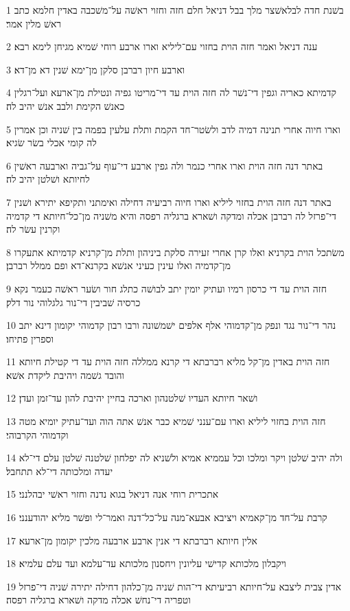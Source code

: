 \par 1 בשׁנת חדה לבלאשׁצר מלך בבל דניאל חלם חזה וחזוי ראשׁה על־משׁכבה באדין חלמא כתב ראשׁ מלין אמר׃
\par 2 ענה דניאל ואמר חזה הוית בחזוי עם־ליליא וארו ארבע רוחי שׁמיא מגיחן לימא רבא׃
\par 3 וארבע חיון רברבן סלקן מן־ימא שׁנין דא מן־דא׃
\par 4 קדמיתא כאריה וגפין די־נשׁר לה חזה הוית עד די־מריטו גפיה ונטילת מן־ארעא ועל־רגלין כאנשׁ הקימת ולבב אנשׁ יהיב לה׃
\par 5 וארו חיוה אחרי תנינה דמיה לדב ולשׂטר־חד הקמת ותלת עלעין בפמה בין שׁניה וכן אמרין לה קומי אכלי בשׂר שׂגיא׃
\par 6 באתר דנה חזה הוית וארו אחרי כנמר ולה גפין ארבע די־עוף על־גביה וארבעה ראשׁין לחיותא ושׁלטן יהיב לה׃
\par 7 באתר דנה חזה הוית בחזוי ליליא וארו חיוה רביעיה דחילה ואימתני ותקיפא יתירא ושׁנין די־פרזל לה רברבן אכלה ומדקה ושׁארא ברגליה רפסה והיא משׁניה מן־כל־חיותא די קדמיה וקרנין עשׂר לה׃
\par 8 משׂתכל הוית בקרניא ואלו קרן אחרי זעירה סלקת ביניהון ותלת מן־קרניא קדמיתא אתעקרו מן־קדמיה ואלו עינין כעיני אנשׁא בקרנא־דא ופם ממלל רברבן׃
\par 9 חזה הוית עד די כרסון רמיו ועתיק יומין יתב לבושׁה כתלג חור ושׂער ראשׁה כעמר נקא כרסיה שׁביבין די־נור גלגלוהי נור דלק׃
\par 10 נהר די־נור נגד ונפק מן־קדמוהי אלף אלפים ישׁמשׁונה ורבו רבון קדמוהי יקומון דינא יתב וספרין פתיחו׃
\par 11 חזה הוית באדין מן־קל מליא רברבתא די קרנא ממללה חזה הוית עד די קטילת חיותא והובד גשׁמה ויהיבת ליקדת אשׁא׃
\par 12 ושׁאר חיותא העדיו שׁלטנהון וארכה בחיין יהיבת להון עד־זמן ועדן׃
\par 13 חזה הוית בחזוי ליליא וארו עם־ענני שׁמיא כבר אנשׁ אתה הוה ועד־עתיק יומיא מטה וקדמוהי הקרבוהי׃
\par 14 ולה יהיב שׁלטן ויקר ומלכו וכל עממיא אמיא ולשׁניא לה יפלחון שׁלטנה שׁלטן עלם די־לא יעדה ומלכותה די־לא תתחבל׃
\par 15 אתכרית רוחי אנה דניאל בגוא נדנה וחזוי ראשׁי יבהלנני׃
\par 16 קרבת על־חד מן־קאמיא ויציבא אבעא־מנה על־כל־דנה ואמר־לי ופשׁר מליא יהודענני׃
\par 17 אלין חיותא רברבתא די אנין ארבע ארבעה מלכין יקומון מן־ארעא׃
\par 18 ויקבלון מלכותא קדישׁי עליונין ויחסנון מלכותא עד־עלמא ועד עלם עלמיא׃
\par 19 אדין צבית ליצבא על־חיותא רביעיתא די־הות שׁניה מן־כלהון דחילה יתירה שׁניה די־פרזל וטפריה די־נחשׁ אכלה מדקה ושׁארא ברגליה רפסה׃

